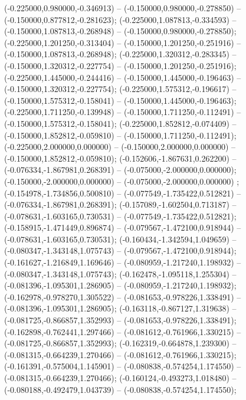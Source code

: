  (-0.225000,0.980000,-0.346913) -- (-0.150000,0.980000,-0.278850) -- (-0.150000,0.877812,-0.281623);
 (-0.225000,1.087813,-0.334593) -- (-0.150000,1.087813,-0.268948) -- (-0.150000,0.980000,-0.278850);
 (-0.225000,1.201250,-0.313404) -- (-0.150000,1.201250,-0.251916) -- (-0.150000,1.087813,-0.268948);
 (-0.225000,1.320312,-0.283345) -- (-0.150000,1.320312,-0.227754) -- (-0.150000,1.201250,-0.251916);
 (-0.225000,1.445000,-0.244416) -- (-0.150000,1.445000,-0.196463) -- (-0.150000,1.320312,-0.227754);
 (-0.225000,1.575312,-0.196617) -- (-0.150000,1.575312,-0.158041) -- (-0.150000,1.445000,-0.196463);
 (-0.225000,1.711250,-0.139948) -- (-0.150000,1.711250,-0.112491) -- (-0.150000,1.575312,-0.158041);
 (-0.225000,1.852812,-0.074409) -- (-0.150000,1.852812,-0.059810) -- (-0.150000,1.711250,-0.112491);
 (-0.225000,2.000000,0.000000) -- (-0.150000,2.000000,0.000000) -- (-0.150000,1.852812,-0.059810);
 (-0.152606,-1.867631,0.262200) -- (-0.076334,-1.867981,0.268391) -- (-0.075000,-2.000000,0.000000);
 (-0.150000,-2.000000,0.000000) -- (-0.075000,-2.000000,0.000000) ;
 (-0.154978,-1.734856,0.500810) -- (-0.077549,-1.735422,0.512821) -- (-0.076334,-1.867981,0.268391);
 (-0.157089,-1.602504,0.713187) -- (-0.078631,-1.603165,0.730531) -- (-0.077549,-1.735422,0.512821);
 (-0.158915,-1.471449,0.896874) -- (-0.079567,-1.472100,0.918944) -- (-0.078631,-1.603165,0.730531);
 (-0.160434,-1.342594,1.049659) -- (-0.080347,-1.343148,1.075743) -- (-0.079567,-1.472100,0.918944);
 (-0.161627,-1.216849,1.169646) -- (-0.080959,-1.217240,1.198932) -- (-0.080347,-1.343148,1.075743);
 (-0.162478,-1.095118,1.255304) -- (-0.081396,-1.095301,1.286905) -- (-0.080959,-1.217240,1.198932);
 (-0.162978,-0.978270,1.305522) -- (-0.081653,-0.978226,1.338491) -- (-0.081396,-1.095301,1.286905);
 (-0.163118,-0.867127,1.319638) -- (-0.081725,-0.866857,1.352993) -- (-0.081653,-0.978226,1.338491);
 (-0.162898,-0.762441,1.297466) -- (-0.081612,-0.761966,1.330215) -- (-0.081725,-0.866857,1.352993);
 (-0.162319,-0.664878,1.239300) -- (-0.081315,-0.664239,1.270466) -- (-0.081612,-0.761966,1.330215);
 (-0.161391,-0.575004,1.145901) -- (-0.080838,-0.574254,1.174550) -- (-0.081315,-0.664239,1.270466);
 (-0.160124,-0.493273,1.018480) -- (-0.080188,-0.492479,1.043739) -- (-0.080838,-0.574254,1.174550);
